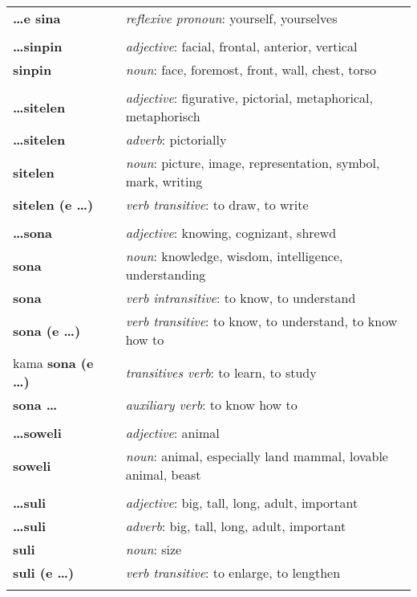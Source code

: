 \begin{supertabular}{p{2,5cm}|ll}
\textbf{\dots e sina} && \textit{reflexive pronoun}: yourself, yourselves \\  
 && \\ %
\textbf{\dots sinpin} && \textit{adjective}: facial, frontal, anterior, vertical \\ 
\textbf{sinpin} && \textit{noun}: face, foremost, front, wall, chest, torso \\ 
 && \\ %
\textbf{\dots sitelen} && \textit{adjective}: figurative, pictorial, metaphorical, metaphorisch \\ 
\textbf{\dots sitelen} && \textit{adverb}: pictorially \\ 
\textbf{sitelen} && \textit{noun}: picture, image, representation, symbol, mark, writing \\ 
\textbf{sitelen (e \dots)} && \textit{verb transitive}: to draw, to write \\ 
 && \\ %
\textbf{\dots sona} && \textit{adjective}: knowing, cognizant, shrewd \\ 
\textbf{sona} && \textit{noun}: knowledge, wisdom, intelligence, understanding \\ 
\textbf{sona} && \textit{verb intransitive}: to know, to understand \\ 
\textbf{sona (e \dots)} && \textit{verb transitive}: to know, to understand, to know how to \\ 
kama \textbf{sona (e \dots)} && \textit{transitives verb}: to learn, to study \\ 
\textbf{sona \dots} && \textit{auxiliary verb}: to know how to \\ 
 && \\ %
\textbf{\dots soweli} && \textit{adjective}: animal \\ 
\textbf{soweli} && \textit{noun}: animal, especially land mammal, lovable animal, beast \\ 
 && \\ %
\textbf{\dots suli} && \textit{adjective}: big, tall, long, adult, important \\ 
\textbf{\dots suli} && \textit{adverb}: big, tall, long, adult, important \\ 
\textbf{suli} && \textit{noun}: size \\ 
\textbf{suli (e \dots)} && \textit{verb transitive}: to enlarge, to lengthen \\ 
 && \\ %

\end{supertabular}
